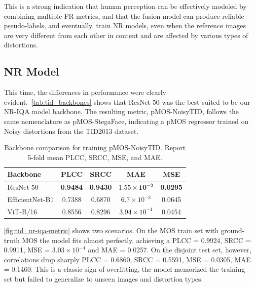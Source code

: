 This is a strong indication that human perception can be effectively modeled by combining multiple \acs{FR} metrics, and that the fusion model can produce reliable pseudo-labels, and eventually, train \acs{NR} models, even when the reference images are very different from each other in content and are affected by various types of distortions.

\subsection{\acl{NR} Model}

This time, the differences in performance were clearly evident.~\autoref{tab:tid_backbones} shows that ResNet-50 was the best suited to be our \acs{NR-IQA} model backbone. The resulting metric, \acf{pMOS-NoisyTID}, follows the same nomenclature as \acs{pMOS-StegaFace}, indicating a \acs{pMOS} regressor trained on Noisy distortions from the \acs{TID}2013 dataset.

\begin{table}[htpb]
\centering
\caption{Backbone comparison for training \acs{pMOS-NoisyTID}. Report 5-fold mean \acs{PLCC}, \acs{SRCC}, \acs{MSE}, and \acs{MAE}.}
\label{tab:tid_backbones}
\begin{tabular}{lcccc}
\hline
\textbf{Backbone}        & \textbf{PLCC} & \textbf{SRCC} & \textbf{MAE} & \textbf{MSE} \\ \hline
ResNet-50       & \textbf{0.9484} & \textbf{0.9430} &  $\mathbf{1.55 \times 10^{-3}}$ & \textbf{0.0295}   \\
EfficientNet-B1 & 0.7388     & 0.6870     & $6.7 \times 10^{-3}$   & 0.0645   \\
ViT-B/16        & 0.8556     & 0.8296     & $3.94 \times 10^{-4}$   & 0.0454   \\
\hline
\end{tabular}
\end{table}

\autoref{fig:tid_nr-iqa-metric} shows two scenarios. On the \acs{MOS} train set with ground-truth \acs{MOS} the model fits almost perfectly, achieving a \acs{PLCC} = 0.9924, \acs{SRCC} = 0.9911, \acs{MSE} = $3.03 \times 10^{-4}$ and \acs{MAE} = 0.0257. On the disjoint test set, however, correlations drop sharply \acs{PLCC} = 0.6860, \acs{SRCC} = 0.5591, \acs{MSE} = 0.0305, \acs{MAE} = 0.1460. This is a classic sign of overfitting, the model memorized the training set but failed to generalize to unseen images and distortion types.

